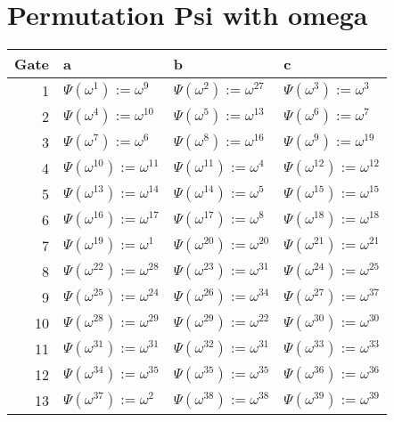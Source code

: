 \documentclass[11pt]{article}
\begin{document}
\section{Permutation Psi with omega}
\label{sec:org35f2b9a}
\begin{center}
\begin{tabular}{rlll}
Gate & a & b & c\\[0pt]
\hline
1 & \(\Psi(\omega^1) := \omega^9\) & \(\Psi(\omega^2):=\omega^{27}\) & \(\Psi(\omega^3) := \omega^3\)\\[0pt]
2 & \(\Psi(\omega^4) := \omega^{10}\) & \(\Psi(\omega^5):=\omega^{13}\) & \(\Psi(\omega^6) := \omega^7\)\\[0pt]
3 & \(\Psi(\omega^7) := \omega^6\) & \(\Psi(\omega^8) := \omega^{16}\) & \(\Psi(\omega^9) := \omega^{19}\)\\[0pt]
4 & \(\Psi(\omega^{10}) := \omega^{11}\) & \(\Psi(\omega^{11}) := \omega^4\) & \(\Psi(\omega^{12}) := \omega^{12}\)\\[0pt]
5 & \(\Psi(\omega^{13}) := \omega^{14}\) & \(\Psi(\omega^{14}) := \omega^{5}\) & \(\Psi(\omega^{15}) := \omega^{15}\)\\[0pt]
6 & \(\Psi(\omega^{16}) := \omega^{17}\) & \(\Psi(\omega^{17}) := \omega^{8}\) & \(\Psi(\omega^{18}) := \omega^{18}\)\\[0pt]
7 & \(\Psi(\omega^{19}) := \omega^{1}\) & \(\Psi(\omega^{20}) := \omega^{20}\) & \(\Psi(\omega^{21}) := \omega^{21}\)\\[0pt]
8 & \(\Psi(\omega^{22}) := \omega^{28}\) & \(\Psi(\omega^{23}) := \omega^{31}\) & \(\Psi(\omega^{24}) := \omega^{25}\)\\[0pt]
9 & \(\Psi(\omega^{25}) := \omega^{24}\) & \(\Psi(\omega^{26}) := \omega^{34}\) & \(\Psi(\omega^{27}) := \omega^{37}\)\\[0pt]
10 & \(\Psi(\omega^{28}) := \omega^{29}\) & \(\Psi(\omega^{29}) := \omega^{22}\) & \(\Psi(\omega^{30}) := \omega^{30}\)\\[0pt]
11 & \(\Psi(\omega^{31}) := \omega^{31}\) & \(\Psi(\omega^{32}) := \omega^{31}\) & \(\Psi(\omega^{33}) := \omega^{33}\)\\[0pt]
12 & \(\Psi(\omega^{34}) := \omega^{35}\) & \(\Psi(\omega^{35}) := \omega^{35}\) & \(\Psi(\omega^{36}) := \omega^{36}\)\\[0pt]
13 & \(\Psi(\omega^{37}) := \omega^{2}\) & \(\Psi(\omega^{38}) := \omega^{38}\) & \(\Psi(\omega^{39}) := \omega^{39}\)\\[0pt]
\hline
\end{tabular}
\end{center}
\end{document}

